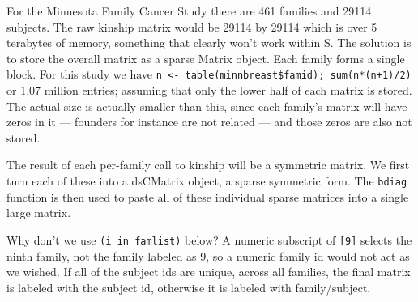 \documentclass{article}
\begin{document}
For the Minnesota Family Cancer Study there are 461 families and 29114
subjects.  The raw kinship matrix would be 29114 by 29114 which is over
5 terabytes of memory, something that clearly won't work within S.       %
The solution is to store the overall matrix as a sparse Matrix object.
Each family forms a single block.  For this study we have
\Verb!n <- table(minnbreast$famid); sum(n*(n+1)/2)! or 1.07 million entries;
assuming that only the lower half of each matrix is stored.
The actual size is actually smaller than this, since each family's
matrix will have zeros in it --- founders for instance are not related ---
and those zeros are also not stored.

The result of each per-family call to kinship will be a symmetric matrix.
We first turn each of these into a dsCMatrix object, a sparse symmetric
form. 
The \Verb!bdiag! function is then used to paste all of these individual
sparse matrices into a single large matrix.

Why don't we use \Verb!(i in famlist)! below?  A numeric subscript of \Verb+[9]+ %
selects the ninth family, not the family labeled as 9, so a numeric
family id would not act as we wished.
If all of the subject ids are unique, across all families, the final
matrix is labeled with the subject id, otherwise it is labeled with
family/subject.
\end{document}
